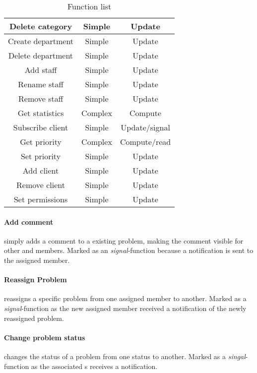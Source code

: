 \begin{table}[h]
\begin{center}
\begin{tabular}{|c|c|c|}
Delete category & Simple & Update \\ \hline%
Create department & Simple & Update \\ \hline%
Delete department & Simple & Update \\ \hline%
Add staff & Simple & Update \\ \hline%
Rename staff & Simple & Update \\ \hline%
Remove staff & Simple & Update \\ \hline%
Get statistics & Complex & Compute \\ \hline%
Subscribe client & Simple & Update/signal \\ \hline%
Get priority & Complex & Compute/read \\ \hline%
Set priority & Simple & Update \\ \hline%
Add client & Simple & Update \\ \hline%
Remove client & Simple & Update \\ \hline%
Set permissions & Simple & Update \\ \hline%

\end{tabular}
\end{center}
\caption{Function list}
\label{tab:functionlist}
\end{table}


\paragraph{Add comment} simply adds a comment to a existing problem, making the comment visible for other \client{} and \astaff[] members. Marked as an \textit{signal}-function because a notification is sent to the assigned \astaff[] member.  

\paragraph{Reassign Problem} reassigns a specific problem from one assigned \astaff[] member to another. Marked as a \textit{signal}-function as the new assigned \astaff[] member received a notification of the newly reassigned problem. 

\paragraph{Change problem status} changes the status of a problem from one status to another. Marked as a \textit{singal}-function as the associated \client s receives a notification. 

